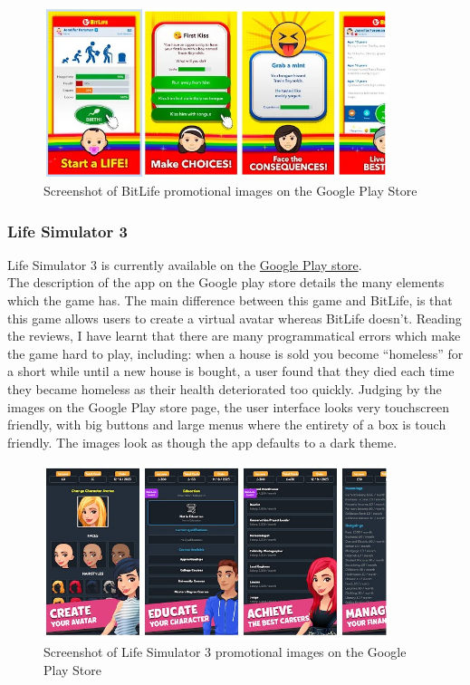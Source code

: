 \begin{figure}[H]
    \centering
    \includegraphics[width=0.9\textwidth]{images/analysis/bitLife.jpg}
    \caption{Screenshot of BitLife promotional images on the Google Play Store}
    \label{fig:bitLife}
\end{figure}

\subsubsection{Life Simulator 3}
Life Simulator 3 is currently available on the \href{https://play.google.com/store/apps/details?id=uk.playdrop.lifesimulatorpro}{Google Play store}.\\
The description of the app on the Google play store details the many elements which the game has. The main difference between this game and BitLife, is that this game allows users to create a virtual avatar whereas BitLife doesn’t.
Reading the reviews, I have learnt that there are many programmatical errors which make the game hard to play, including: when a house is sold you become “homeless” for a short while until a new house is bought, a user found that they died each time they became homeless as their health deteriorated too quickly.
Judging by the images on the Google Play store page, the user interface looks very touchscreen friendly, with big buttons and large menus where the entirety of a box is touch friendly. The images look as though the app defaults to a dark theme.
\begin{figure}[H]
    \centering
    \includegraphics[width=0.9\textwidth]{images/analysis/lifeSim3.jpg}
    \caption{Screenshot of Life Simulator 3 promotional images on the Google Play Store}
    \label{fig:lifeSim3}
\end{figure}

